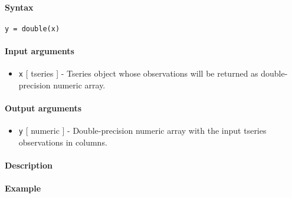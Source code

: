 


	\paragraph{Syntax}

\begin{verbatim}
y = double(x)
\end{verbatim}

\paragraph{Input arguments}

\begin{itemize}
\itemsep1pt\parskip0pt
\item
  \texttt{x} {[} tseries {]} - Tseries object whose observations will be
  returned as double-precision numeric array.
\end{itemize}

\paragraph{Output arguments}

\begin{itemize}
\itemsep1pt\parskip0pt
\item
  \texttt{y} {[} numeric {]} - Double-precision numeric array with the
  input tseries observations in columns.
\end{itemize}

\paragraph{Description}

\paragraph{Example}


